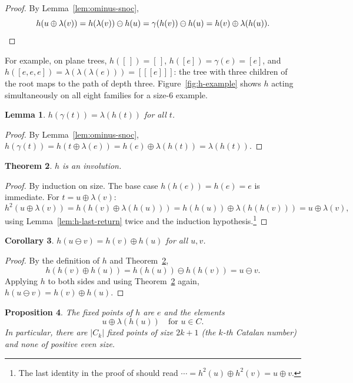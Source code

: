 \documentclass[a4paper,11pt]{article}
\newtheorem{theorem}{Theorem}[section]
\newtheorem{lemma}[theorem]{Lemma}
\newtheorem{proposition}[theorem]{Proposition}
\newtheorem{corollary}[theorem]{Corollary}
\theoremstyle{definition}
\begin{document}
\begin{proof}
By Lemma~\ref{lem:ominus-snoc},
\[
  h(u \oplus \lambda(v))
    = h(\lambda(v)) \ominus h(u)
    = \gamma(h(v)) \ominus h(u)
    = h(v) \oplus \lambda(h(u)).  \qedhere
\]
\end{proof}

For example, on plane trees,
$h([\,]) = [\,]$,
$h([e]) = \gamma(e) = [e]$,
and $h([e, e, e]) = \lambda(\lambda(\lambda(e)))
= [[[e]]]$: the tree with three children of the root
maps to the path of depth three.
Figure~\ref{fig:h-example} shows $h$ acting
simultaneously on all eight families for a size-$6$
example.

\begin{lemma}\label{lem:h-gamma}
$h(\gamma(t)) = \lambda(h(t))$ for all $t$.
\end{lemma}

\begin{proof}
By Lemma~\ref{lem:ominus-snoc},
$h(\gamma(t)) = h(t \oplus \lambda(e))
  = h(e) \oplus \lambda(h(t)) = \lambda(h(t))$.
\end{proof}

\begin{theorem}\label{thm:h-involution}
$h$ is an involution.
\end{theorem}

\begin{proof}
By induction on size. The base case
$h(h(e)) = h(e) = e$ is immediate. For
$t = u \oplus \lambda(v)$:
\[
  h^2(u \oplus \lambda(v))
    = h(h(v) \oplus \lambda(h(u)))
    = h(h(u)) \oplus \lambda(h(h(v)))
    = u \oplus \lambda(v),
\]
using Lemma~\ref{lem:h-last-return} twice and the
induction hypothesis.\footnote{The last identity in the
  proof of \cite[Theorem~5]{CKS13} should read
  $\cdots = h^2(u) \oplus h^2(v) = u \oplus v$.}
\end{proof}

\begin{corollary}
  $h(u \ominus v) = h(v) \oplus h(u)$ for all $u, v$.
\end{corollary}

\begin{proof}
By the definition of $h$ and Theorem~\ref{thm:h-involution},
\[
  h(h(v) \oplus h(u)) = h(h(u)) \ominus h(h(v)) = u \ominus v.
\]
Applying $h$ to both sides and using Theorem~\ref{thm:h-involution} again,
$h(u \ominus v) = h(v) \oplus h(u)$.
\end{proof}

\begin{proposition}\label{prop:h-fixed-points}
The fixed points of $h$ are $e$ and the elements
\[
  u \oplus \lambda(h(u)) \quad \text{for } u \in C.
\]
In particular, there are $|C_k|$ fixed points of size $2k+1$ (the $k$-th Catalan
number) and none of positive even size.
\end{proposition}
\end{document}
